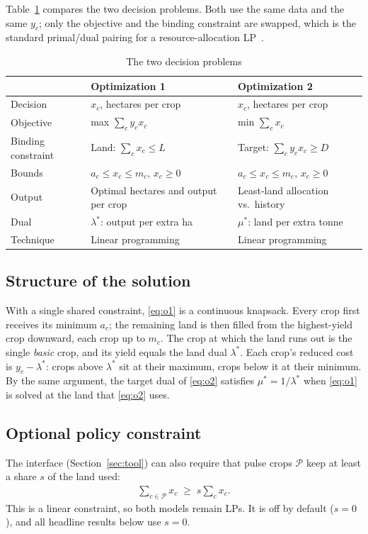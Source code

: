 \documentclass[conference]{IEEEtran}
\begin{document}
Table~\ref{tab:models} compares the two decision problems. Both use the same data and the
same $y_c$; only the objective and the binding constraint are swapped, which is the standard
primal/dual pairing for a resource-allocation LP~\cite{taha2017,paidipati2017}.

\begin{table}[!t]
\centering
\caption{The two decision problems}\label{tab:models}
\setlength{\tabcolsep}{3pt}
\begin{tabular}{@{}p{1.45cm}p{3.15cm}p{3.15cm}@{}}
\toprule
 & Optimization 1 & Optimization 2\\
\midrule
Decision & $x_c$, hectares per crop & $x_c$, hectares per crop\\
Objective & max $\sum_c y_c x_c$ & min $\sum_c x_c$\\
Binding constraint & Land: $\sum_c x_c\le L$ & Target: $\sum_c y_c x_c\ge D$\\
Bounds & $a_c\le x_c\le m_c$, $x_c\ge0$ & $a_c\le x_c\le m_c$, $x_c\ge0$\\
Output & Optimal hectares and output per crop & Least-land allocation vs.\ history\\
Dual & $\lambda^*$: output per extra ha & $\mu^*$: land per extra tonne\\
Technique & Linear programming & Linear programming\\
\bottomrule
\end{tabular}
\end{table}

\subsection{Structure of the solution}
With a single shared constraint, \eqref{eq:o1} is a continuous knapsack. Every crop first
receives its minimum $a_c$; the remaining land is then filled from the highest-yield crop
downward, each crop up to $m_c$. The crop at which the land runs out is the single
\emph{basic} crop, and its yield equals the land dual $\lambda^*$. Each crop's reduced cost
is $y_c-\lambda^*$: crops above $\lambda^*$ sit at their maximum, crops below it at their
minimum. By the same argument, the target dual of \eqref{eq:o2} satisfies $\mu^*=1/\lambda^*$
when \eqref{eq:o1} is solved at the land that \eqref{eq:o2} uses.

\subsection{Optional policy constraint}
The interface (Section~\ref{sec:tool}) can also require that pulse crops $\mathcal P$ keep at
least a share $s$ of the land used:
\begin{align}
\textstyle\sum_{c\in\mathcal P} x_c \;\ge\; s\sum_c x_c. \label{eq:pulse}
\end{align}
This is a linear constraint, so both models remain LPs. It is off by default ($s=0$), and all
headline results below use $s=0$.
\end{document}
